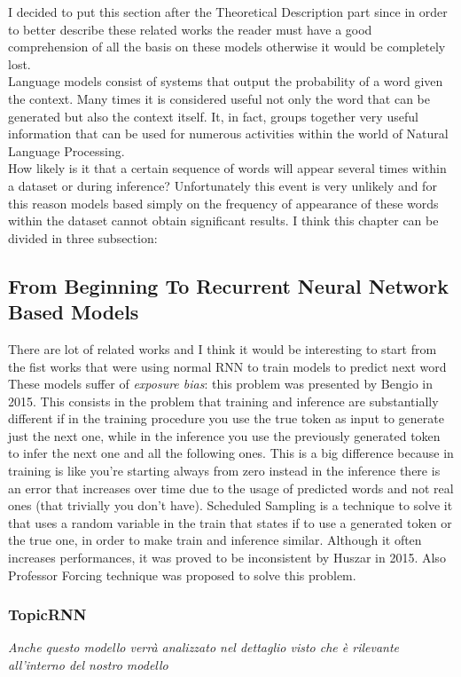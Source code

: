 I decided to put this section after the Theoretical Description part since in order to better describe these related works the reader must have a good comprehension of all the basis on these models otherwise it would be completely lost. \\ 
Language models consist of systems that output the probability of a word given the context. Many times it is considered useful not only the word that can be generated but also the context itself. It, in fact, groups together very useful information that can be used for numerous activities within the world of Natural Language Processing. \\
How likely is it that a certain sequence of words will appear several times within a dataset or during inference? Unfortunately this event is very unlikely and for this reason models based simply on the frequency of appearance of these words within the dataset cannot obtain significant results.
I think this chapter can be divided in three subsection: 
\subsection{From Beginning To Recurrent Neural Network Based Models}

There are lot of related works and I think it would be interesting to start from the fist works that were using normal RNN to train models to predict next word \cite{Bengio2003} \cite{Mikolov2010}  \\
These models suffer of \textit{exposure bias}: this problem was presented by Bengio\cite{BengioSS} in 2015. This consists in the problem that training and inference are substantially different if in the training procedure you use the true token as input to generate just the next one, while in the inference you use the previously generated token to infer the next one and all the following ones. This is a big difference because in training is like you’re starting always from zero instead in the inference there is an error that increases over time due to the usage of predicted words and not real ones (that trivially you don’t have). Scheduled Sampling is a technique to solve it that uses a random variable in the train that states if to use a generated token or the true one, in order to make train and inference similar. Although it often increases performances, it was proved to be inconsistent by Huszar in 2015.\cite{Huszar} Also Professor Forcing \cite{LambTF} technique was proposed to solve this problem.

\subsubsection[TopicRNN]{TopicRNN \cite{Dieng}}
\label{sect:TopicRNN}
\textit{Anche questo modello verrà analizzato nel dettaglio visto che è rilevante all'interno del nostro modello}

